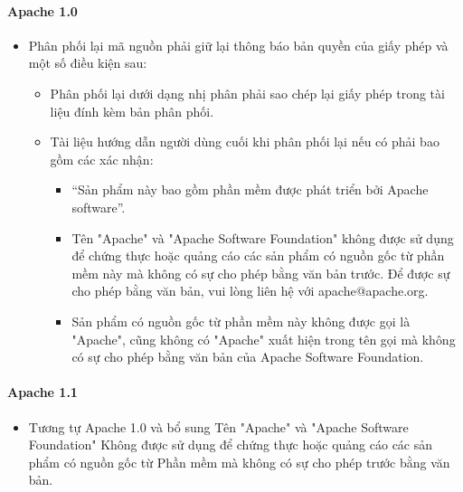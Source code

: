 \documentclass[12pt]{article}
\begin{document}
\paragraph{Apache 1.0}
\begin{itemize}
\item  Phân phối lại mã nguồn phải giữ lại thông báo bản quyền của giấy phép và một số điều kiện sau: 
\begin{itemize}
\item Phân phối lại dưới dạng nhị phân phải sao chép lại giấy phép trong tài liệu đính kèm bản phân phối. 
\item Tài liệu hướng dẫn người dùng cuối khi phân phối lại nếu có phải bao gồm các xác nhận:
\begin{itemize}
\item “Sản phẩm này bao gồm phần mềm được phát triển bởi Apache software”.
\item Tên "Apache" và "Apache Software Foundation" không được sử dụng để chứng thực hoặc quảng cáo các sản phẩm có nguồn gốc từ phần mềm này mà không có sự cho phép bằng văn bản trước. Để được sự cho phép bằng văn bản, vui lòng liên hệ với apache@apache.org.
\item Sản phẩm có nguồn gốc từ phần mềm này không được gọi là "Apache", cũng không có "Apache" xuất hiện trong tên gọi mà không có sự cho phép bằng văn bản của Apache Software Foundation. 
\end{itemize}
\end{itemize}
\end{itemize}

\paragraph{Apache 1.1}
\begin{itemize}
\item  Tương tự Apache 1.0 và bổ sung Tên "Apache" và "Apache Software Foundation" Không được sử dụng để chứng thực hoặc quảng cáo các sản phẩm có nguồn gốc từ Phần mềm mà không có sự cho phép trước bằng văn bản.
\end{itemize}
\end{document}
